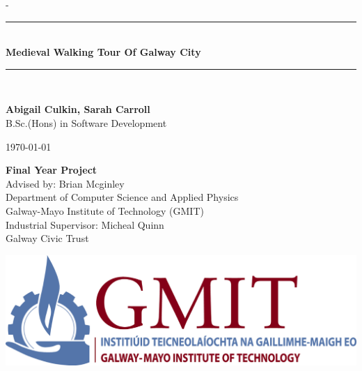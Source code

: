 -\documentclass[12pt,a4paper,oneside,openany]{book}
\newcommand{\projecttitle}{Medieval Walking Tour Of Galway City}
\newcommand{\projectauthor}{Abigail Culkin, Sarah Carroll}
\newcommand{\projectadvisor}{Brian Mcginley}
\newcommand{\projectprogramme}{B.Sc.(Hons) in Software Development}
\newcommand{\industrialsupervisor}{Micheal Quinn}
\newcommand{\industrialcompany}{Galway Civic Trust}
\newcommand{\projectdate}{\today}
\begin{document}
  \begin{titlepage}
    \begin{minipage}[t][6cm]{\textwidth}
      \centering
      \rule{\linewidth}{0.5mm} \\[0.4cm]
      { \LARGE \bfseries \projecttitle \\[0.4cm] }
      \rule{\linewidth}{0.5mm} \\[0.8cm]
    \end{minipage}
	
	\begin{minipage}[t][6.5cm]{\textwidth}
      \centering
      \textbf{\projectauthor}\\[0.5cm]
      \projectprogramme
    \end{minipage}
  
    \begin{minipage}[t][1cm]{\textwidth}
      \centering
      \textsc{\projectdate}
    \end{minipage}
      
    \begin{minipage}[t][3cm]{\textwidth}
      \centering
      \textbf{Final Year Project}\\[0.3cm]
      Advised by: \projectadvisor \\[0.1cm]
      Department of Computer Science and Applied Physics\\
      Galway-Mayo Institute of Technology (GMIT)\\
      Industrial Supervisor: \industrialsupervisor\\
      \industrialcompany
	\end{minipage}
	
	\begin{center}    
      \includegraphics{img/gmit-logo.jpg}
    \end{center}
      
 \end{titlepage}

 \setcounter{page}{2}
  \tableofcontents
  \listoffigures
  
  
  
\end{document}
